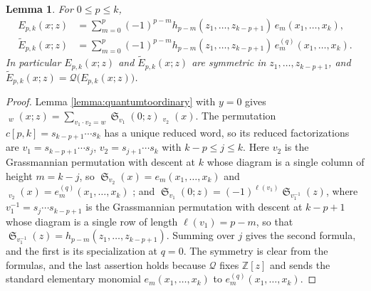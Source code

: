 \documentclass{amsart}
\newtheorem{lemma}{Lemma}[section]
\theoremstyle{definition}
\theoremstyle{remark}
\numberwithin{equation}{section}
\DeclareMathOperator{\sch}{\mathfrak{S}}
\DeclareMathOperator{\qsch}{\widetilde{\mathfrak{S}}}
\newcommand{\qelem}{\widetilde{E}}
\begin{document}
\begin{lemma} \label{lemma:Ehe}
For $0\leq p\leq k$,
\begin{align*}
E_{p,k}(x;z)&=\sum_{m=0}^{p}(-1)^{p-m}h_{p-m}(z_1,\ldots,z_{k-p+1})\,e_m(x_1,\ldots,x_k),\\
\qelem_{p,k}(x;z)&=\sum_{m=0}^{p}(-1)^{p-m}h_{p-m}(z_1,\ldots,z_{k-p+1})\,e^{(q)}_m(x_1,\ldots,x_k).
\end{align*}
In particular $E_{p,k}(x;z)$ and $\qelem_{p,k}(x;z)$ are symmetric in $z_1,\ldots,z_{k-p+1}$, and $\qelem_{p,k}(x;z)=\mathcal Q\big(E_{p,k}(x;z)\big)$.
\end{lemma}
\begin{proof}
Lemma \ref{lemma:quantumtoordinary} with $y=0$ gives $\qsch_w(x;z)=\sum_{v_1\cdot v_2=w}\sch_{v_1}(0;z)\qsch_{v_2}(x)$. The permutation $c[p,k]=s_{k-p+1}\cdots s_k$ has a unique reduced word, so its reduced factorizations are $v_1=s_{k-p+1}\cdots s_j$, $v_2=s_{j+1}\cdots s_k$ with $k-p\leq j\leq k$. Here $v_2$ is the Grassmannian permutation with descent at $k$ whose diagram is a single column of height $m=k-j$, so $\sch_{v_2}(x)=e_m(x_1,\ldots,x_k)$ and $\qsch_{v_2}(x)=e^{(q)}_m(x_1,\ldots,x_k)$ \cite{fomin1997quantum}; and $\sch_{v_1}(0;z)=(-1)^{\ell(v_1)}\sch_{v_1^{-1}}(z)$, where $v_1^{-1}=s_j\cdots s_{k-p+1}$ is the Grassmannian permutation with descent at $k-p+1$ whose diagram is a single row of length $\ell(v_1)=p-m$, so that $\sch_{v_1^{-1}}(z)=h_{p-m}(z_1,\ldots,z_{k-p+1})$. Summing over $j$ gives the second formula, and the first is its specialization at $q=0$. The symmetry is clear from the formulas, and the last assertion holds because $\mathcal Q$ fixes $\mathbb Z[z]$ and sends the standard elementary monomial $e_m(x_1,\ldots,x_k)$ to $e^{(q)}_m(x_1,\ldots,x_k)$.
\end{proof}
\end{document}
